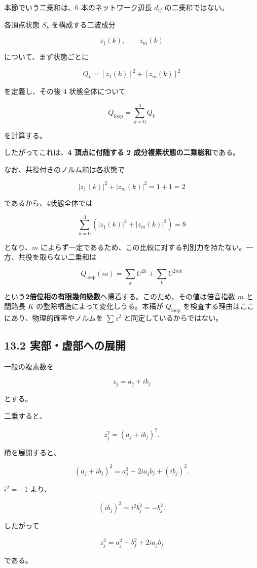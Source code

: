 \documentclass[
  a4paper,
]{ltjsarticle}
\begin{document}
本節でいう二乗和は、6 本のネットワーク辺長 \(d_{ij}\) の二乗和ではない。

各頂点状態 \(S_k\) を構成する二波成分

\[
z_1(k),
\qquad
z_m(k)
\]

について、まず状態ごとに

\[
Q_k
=
[z_1(k)]^2+[z_m(k)]^2
\]

を定義し、その後 4 状態全体について

\[
Q_{\mathrm{loop}}
=
\sum_{k=0}^{3}Q_k
\]

を計算する。

したがってこれは、\textbf{4 頂点に付随する 2
成分複素状態の二乗総和}である。

なお、共役付きのノルム和は各状態で

\[
|z_1(k)|^2+|z_m(k)|^2=1+1=2
\]

であるから、4状態全体では

\[
\sum_{k=0}^{3}\left(|z_1(k)|^2+|z_m(k)|^2\right)=8
\]

となり、\(m\)
によらず一定であるため、この比較に対する判別力を持たない。一方、共役を取らない二乗和は

\[
Q_{\mathrm{loop}}(m)
=
\sum_k U^{2k}+\sum_k U^{2mk}
\]

という\textbf{2倍位相の有限幾何級数}へ帰着する。このため、その値は倍音指数
\(m\) と閉路長 \(K\) の整除構造によって変化しうる。本稿が
\(Q_{\mathrm{loop}}\) を検査する理由はここにあり、物理的確率やノルムを
\(\sum z^2\) と同定しているからではない。

\subsection{13.2
実部・虚部への展開}\label{ux5b9fux90e8ux865aux90e8ux3078ux306eux5c55ux958b}

一般の複素数を

\[
z_j
=
a_j+i b_j
\]

とする。

二乗すると、

\[
z_j^2
=
(a_j+i b_j)^2.
\]

積を展開すると、

\[
(a_j+i b_j)^2
=
a_j^2+2i a_j b_j+(i b_j)^2.
\]

\(i^2=-1\) より、

\[
(i b_j)^2
=
i^2 b_j^2
=
-b_j^2.
\]

したがって

\[
\boxed{
z_j^2
=
a_j^2-b_j^2+2i a_j b_j
}
\]

である。
\end{document}
